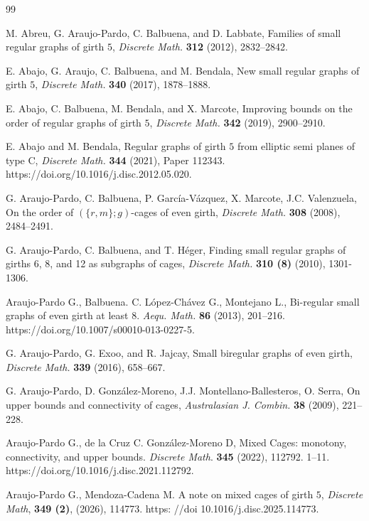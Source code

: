 \documentclass[a4paper,11pt]{article}
\begin{document}
\begin{thebibliography}{99} 

 M. Abreu,  G. Araujo-Pardo, C. Balbuena, and D. Labbate, Families of 
small regular graphs of girth $5$,
{\em Discrete Math.} \textbf{312} (2012), 2832--2842.

 E. Abajo, G. Araujo, C. Balbuena, and M. Bendala, New small regular graphs of girth $5$, {\em Discrete Math.} \textbf{340} (2017), 1878--1888.

 E. Abajo, C. Balbuena, M. Bendala, and X. Marcote, Improving bounds on the order of regular graphs of girth $5$,  {\em Discrete Math.} \textbf{342} (2019), 2900--2910.

 E. Abajo and M. Bendala, Regular graphs of girth $5$ from elliptic semi planes of type C,  {\em Discrete Math.} \textbf{344} (2021), Paper 112343.   
https://doi.org/10.1016/j.disc.2012.05.020.


G. Araujo-Pardo, C. Balbuena, P. García-Vázquez, X. Marcote, J.C. Valenzuela,
On the order of $(\{r,m\};g)$-cages  of even girth,
{\em Discrete Math.} {\bf{308}} (2008), 2484--2491.

G. Araujo-Pardo, C. Balbuena, and T. H\'eger, 
Finding small regular graphs of girths 6, 8, and 12 as subgraphs of cages,
{\em Discrete Math.} {\bf 310 (8)} (2010), 1301-1306.

Araujo-Pardo G., Balbuena. C. López-Chávez G., Montejano L., Bi-regular small graphs of even girth at least 8. 
{\em Aequ. Math.} {\bf 86} (2013), 201--216. 
https://doi.org/10.1007/s00010-013-0227-5.

G. Araujo-Pardo, G. Exoo, and R. Jajcay, Small biregular graphs of even girth,
{\em Discrete Math.} {\bf 339} (2016), 658--667.


G. Araujo-Pardo, D. Gonz\'alez-Moreno, J.J. Montellano-Ballesteros, O. Serra, 
On upper bounds and connectivity of cages,
{\em Australasian J. Combin.} {\bf 38} (2009), 221--228. 

Araujo-Pardo G., de la Cruz C. González-Moreno D,
Mixed Cages: monotony, connectivity, and upper bounds. 
{\em Discrete Math}. {\bf 345} (2022), 112792. 1--11. 
https://doi.org/10.1016/j.disc.2021.112792.

Araujo-Pardo G., Mendoza-Cadena M.
A note on mixed cages of girth $5$,
{\em Discrete Math}, {\bf 349 (2)}, (2026), 114773.
https: //doi 10.1016/j.disc.2025.114773.


\end{thebibliography}
\end{document}
